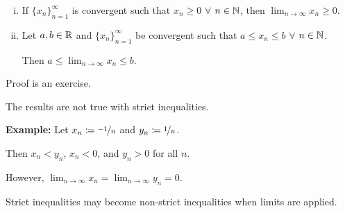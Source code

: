 \documentclass[10pt,aspectratio=169]{beamer}
\begin{document}
\begin{frame}

\begin{corollary}
\begin{enumerate}[(i)]
\item If $\{ x_n \}_{n=1}^\infty$ is convergent
such that $x_n \geq 0$ $\forall$ $n \in {\mathbb{N}}$,
then
\quad
$\displaystyle
\lim_{n\to\infty} x_n \geq 0$.
\item\pause
Let $a,b \in {\mathbb{R}}$ and
$\{ x_n \}_{n=1}^\infty$ be convergent such that
$a \leq x_n \leq b$
$\forall$ $n \in {\mathbb{N}}$.

Then
$\displaystyle a \leq \lim_{n\to\infty} x_n \leq b$.
\end{enumerate}
\end{corollary}

\pause

Proof is an exercise.

\pause
\medskip

The results are not true with strict inequalities.

\pause
\medskip 

\textbf{Example:}
Let $x_n \coloneqq \nicefrac{-1}{n}$ and $y_n \coloneqq \nicefrac{1}{n}$.

\pause
Then $x_n < y_n$, $x_n < 0$, and $y_n > 0$ for all $n$.

\pause
However, $\displaystyle \lim_{n\to\infty} x_n = \lim_{n\to\infty} y_n = 0$.

\pause
\medskip

Strict inequalities may become non-strict
inequalities when limits are applied.
\end{frame}
\end{document}
